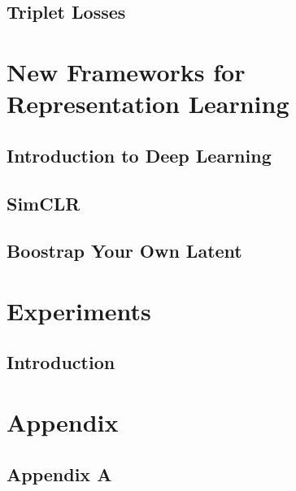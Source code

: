 \documentclass[oneside,openright,titlepage,numbers=noenddot,openany,headinclude,footinclude=true, cleardoublepage=empty,abstractoff,BCOR=5mm,paper=a4,fontsize=11pt, dvipsnames]{scrreprt}
\begin{document}
\chapter{Triplet Losses}

\clearpage

\part{New Frameworks for Representation Learning}
\chapter{Introduction to Deep Learning}

\chapter{SimCLR}

\chapter{Boostrap Your Own Latent}


\part{Experiments}
\chapter{Introduction}



\part{Appendix}
\chapter{Appendix A}




\nocite{*}


\end{document}
